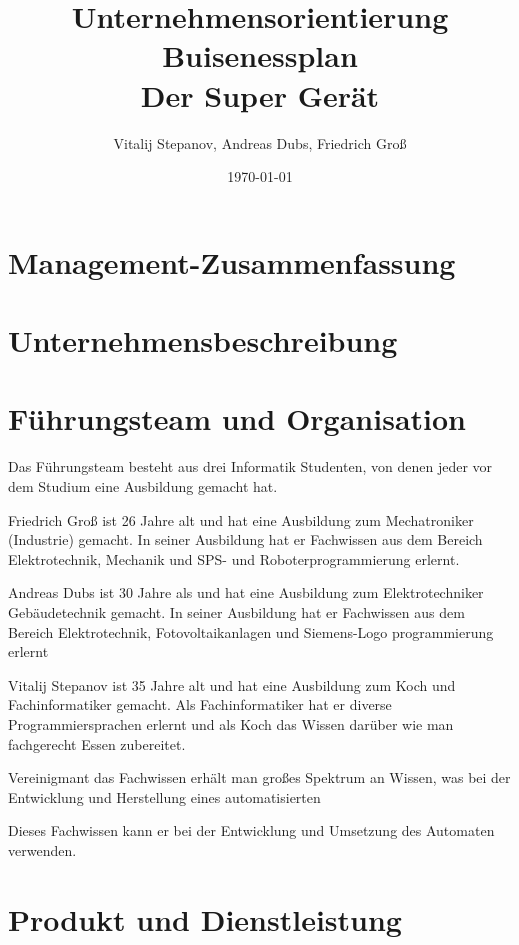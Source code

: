 \documentclass[12pt,a4paper]{scrartcl}
\begin{document}
\title{Unternehmensorientierung\\
	  Buisenessplan\\
	  Der Super Gerät}
\author{Vitalij Stepanov, Andreas Dubs, Friedrich Groß}
\date{\today}
\maketitle


\newpage
\pagestyle{myheadings}
 
\section{Management-Zusammenfassung}

\section{Unternehmensbeschreibung}

\section{Führungsteam und Organisation}
Das Führungsteam besteht aus drei Informatik Studenten, von denen jeder vor dem Studium eine Ausbildung gemacht hat.

Friedrich Groß ist 26 Jahre alt und hat eine Ausbildung zum Mechatroniker (Industrie) gemacht.
In seiner Ausbildung hat er Fachwissen aus dem Bereich Elektrotechnik, Mechanik und SPS- und Roboterprogrammierung erlernt.

Andreas Dubs ist 30 Jahre als und hat eine Ausbildung zum Elektrotechniker Gebäudetechnik gemacht.
In seiner Ausbildung hat er Fachwissen aus dem Bereich Elektrotechnik, Fotovoltaikanlagen und Siemens-Logo programmierung erlernt

Vitalij Stepanov ist 35 Jahre alt und hat eine Ausbildung zum Koch und Fachinformatiker gemacht.
Als Fachinformatiker hat er diverse Programmiersprachen erlernt und als Koch das Wissen darüber wie man fachgerecht Essen zubereitet.

Vereinigmant das Fachwissen erhält man großes Spektrum an Wissen, was bei der Entwicklung und Herstellung eines
automatisierten 

Dieses Fachwissen kann er bei der Entwicklung und Umsetzung des Automaten verwenden.

\section{Produkt und Dienstleistung}
\end{document}
